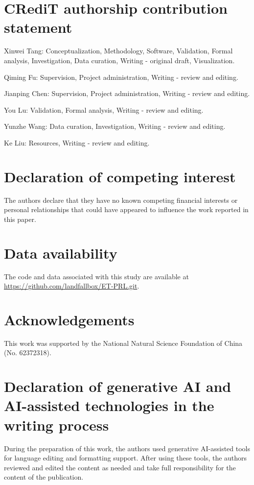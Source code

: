 ﻿\documentclass[preprint,12pt,number]{elsarticle}
\begin{document}
\section*{CRediT authorship contribution statement}
Xinwei Tang: Conceptualization, Methodology, Software, Validation, Formal analysis, Investigation, Data curation, Writing - original draft, Visualization.

Qiming Fu: Supervision, Project administration, Writing - review and editing.

Jianping Chen: Supervision, Project administration, Writing - review and editing.

You Lu: Validation, Formal analysis, Writing - review and editing.

Yunzhe Wang: Data curation, Investigation, Writing - review and editing.

Ke Liu: Resources, Writing - review and editing.

\section*{Declaration of competing interest}
The authors declare that they have no known competing financial interests or personal relationships that could have appeared to influence the work reported in this paper.

\section*{Data availability}
The code and data associated with this study are available at \url{https://github.com/landfallbox/ET-PRL.git}.

\section*{Acknowledgements}
This work was supported by the National Natural Science Foundation of China (No. 62372318).

\section*{Declaration of generative AI and AI-assisted technologies in the writing process}
During the preparation of this work, the authors used generative AI-assisted tools for language editing and formatting support. After using these tools, the authors reviewed and edited the content as needed and take full responsibility for the content of the publication.
\end{document}

